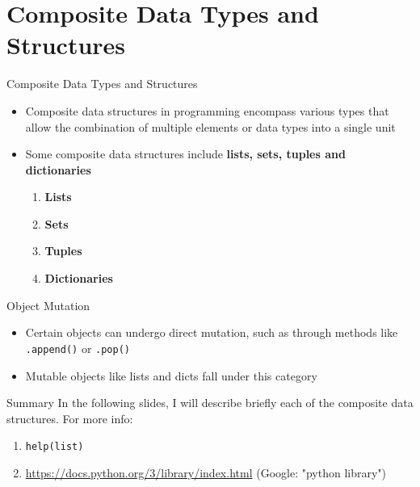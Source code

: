 \documentclass[
	11pt, 
]{beamer}
\begin{document}
\section{Composite Data Types and Structures}

\begin{frame}[fragile]{Composite Data Types and Structures}

\begin{itemize}

\item Composite data structures in programming encompass various types that allow the combination of multiple elements or data types into a single unit

\smallskip
\smallskip

\item Some composite data structures include \textbf{lists, sets, tuples and dictionaries} 
\smallskip
\bigskip
\begin{enumerate}
    \item \textbf{Lists} \smallskip
    \item \textbf{Sets} \smallskip
    \item \textbf{Tuples} \smallskip
    \item \textbf{Dictionaries} 
\end{enumerate}

\end{itemize}
\end{frame}


\begin{frame}[fragile]{Object Mutation}
\begin{itemize}

\item  Certain objects can undergo direct mutation, such as through methods like \texttt{.append()} or \texttt{.pop()}

\item Mutable objects like lists and dicts fall under this category
\end{itemize}

\bigskip

\begin{alertblock}{Summary}
    In the following slides, I will describe briefly each of the composite data structures. For more info:
    \begin{enumerate}

\item  \texttt{help(list)}

\item  \url{https://docs.python.org/3/library/index.html} (Google: "python library")
    \end{enumerate}
\end{alertblock}
\end{frame}
\end{document}
